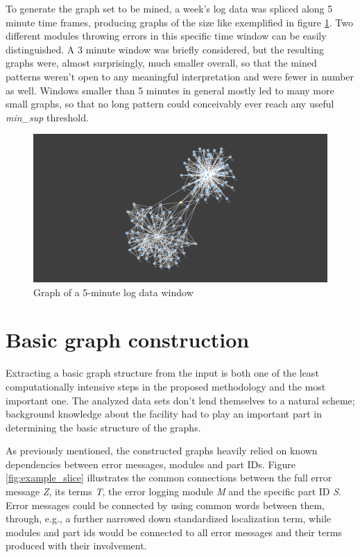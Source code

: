 \documentclass[pdftex,12pt,a4paper]{report}
\begin{document}
To generate the graph set to be mined, a week's log data was spliced along 5 minute time frames, producing graphs of the size like exemplified in figure \ref{fig:partial_graph}. Two different modules throwing errors in this specific time window can be easily distinguished. A 3 minute window was briefly considered, but the resulting graphs were, almost surprisingly, much smaller overall, so that the mined patterns weren't open to any meaningful interpretation and were fewer in number as well. Windows smaller than 5 minutes in general mostly led to many more small graphs, so that no long pattern could conceivably ever reach any useful \textit{min\_sup} threshold.

\begin{figure}
	\centering
	\noindent\includegraphics[width=\linewidth]{images/partial_graph}
	\caption{Graph of a 5-minute log data window}
	\label{fig:partial_graph}
\end{figure}

\section{Basic graph construction}
Extracting a basic graph structure from the input is both one of the least computationally intensive steps in the proposed methodology and the most important one. The analyzed data sets don't lend themselves to a natural scheme; background knowledge about the facility had to play an important part in determining the basic structure of the graphs.

As previously mentioned, the constructed graphs heavily relied on known dependencies between error messages, modules and part IDs. Figure \ref{fig:example_slice} illustrates the common connections between the full error message \textit{Z}, its terms \textit{T}, the error logging module \textit{M} and the specific part ID \textit{S}. Error messages could be connected by using common words between them, through, e.g., a further narrowed down standardized localization term, while modules and part ids would be connected to all error messages and their terms produced with their involvement.
\end{document}
